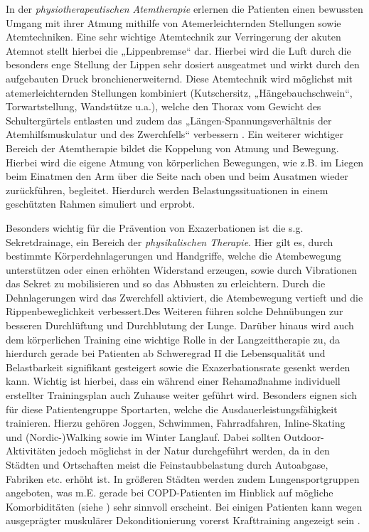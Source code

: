 In der \emph{physiotherapeutischen Atemtherapie} erlernen die Patienten einen bewussten Umgang mit ihrer Atmung mithilfe von Atemerleichternden Stellungen sowie Atemtechniken. Eine sehr wichtige Atemtechnik zur Verringerung der akuten Atemnot stellt hierbei die „Lippenbremse“ dar. Hierbei wird die Luft durch die besonders enge Stellung der Lippen sehr dosiert ausgeatmet und wirkt durch den aufgebauten Druck bronchienerweiternd. Diese Atemtechnik wird möglichst mit atemerleichternden Stellungen kombiniert (Kutschersitz, „Hängebauchschwein“, Torwartstellung, Wandstütze u.a.), welche den Thorax vom Gewicht des Schultergürtels entlasten und zudem das „Längen-Spannungsverhältnis der Atemhilfsmuskulatur und des Zwerchfells“ verbessern \autocite[vgl.][291]{lang2007}. Ein weiterer wichtiger Bereich der Atemtherapie bildet die Koppelung von Atmung und Bewegung. Hierbei wird die eigene Atmung von körperlichen Bewegungen, wie z.B. im Liegen beim Einatmen den Arm über die Seite nach oben und beim Ausatmen wieder zurückführen, begleitet. Hierdurch werden Belastungssituationen in einem geschützten Rahmen simuliert und erprobt.

Besonders wichtig für die Prävention von Exazerbationen ist die s.g. Sekretdrainage, ein Bereich der \emph{physikalischen Therapie}. Hier gilt es, durch bestimmte Körperdehnlagerungen und Handgriffe, welche die Atembewegung unterstützen oder einen erhöhten Widerstand erzeugen, sowie durch Vibrationen das Sekret zu mobilisieren und so das Abhusten zu erleichtern. Durch die Dehnlagerungen wird das Zwerchfell aktiviert, die Atembewegung vertieft und die Rippenbeweglichkeit verbessert.Des Weiteren führen solche Dehnübungen zur besseren Durchlüftung und Durchblutung der Lunge. 
Darüber hinaus wird auch dem körperlichen Training eine wichtige Rolle in der Langzeittherapie zu, da hierdurch gerade bei Patienten ab Schweregrad II die Lebensqualität und Belastbarkeit signifikant gesteigert sowie die Exazerbationsrate gesenkt werden kann. Wichtig ist hierbei, dass ein während einer Rehamaßnahme individuell erstellter Trainingsplan auch Zuhause weiter geführt wird. Besonders eignen sich für diese Patientengruppe Sportarten, welche die Ausdauerleistungsfähigkeit trainieren. Hierzu gehören Joggen, Schwimmen, Fahrradfahren, Inline-Skating und (Nordic-)Walking sowie im Winter Langlauf. Dabei sollten Outdoor-Aktivitäten jedoch möglichst in der Natur durchgeführt werden, da in den Städten und Ortschaften meist die Feinstaubbelastung durch Autoabgase, Fabriken etc. erhöht ist. In größeren Städten werden zudem Lungensportgruppen angeboten, was m.E. gerade bei COPD-Patienten im Hinblick auf mögliche Komorbiditäten (siehe \label{komorbiditaeten}) sehr sinnvoll erscheint. Bei einigen Patienten kann wegen ausgeprägter muskulärer Dekonditionierung vorerst Krafttraining angezeigt sein \autocite[vgl.][291f]{lang2007}.


